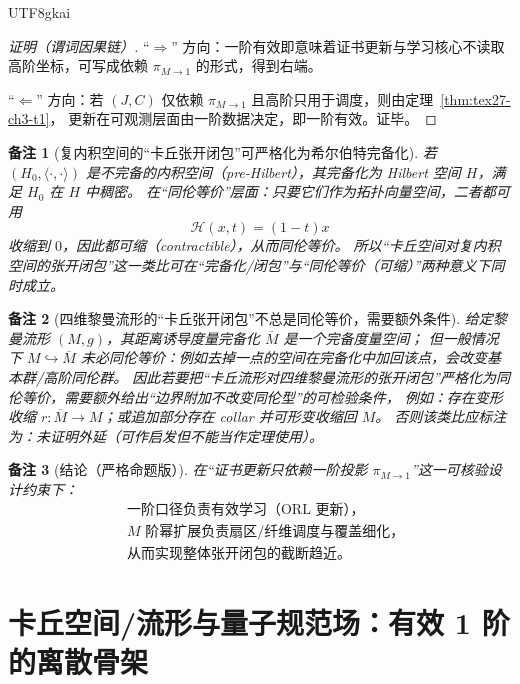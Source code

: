 \documentclass[12pt]{article}
\newtheorem{remark}{备注}[section]
\begin{document}
\begin{CJK*}{UTF8}{gkai}
\begin{proof}[证明（谓词因果链）]
“$\Rightarrow$” 方向：一阶有效即意味着证书更新与学习核心不读取高阶坐标，可写成依赖 $\pi_{M\to 1}$ 的形式，得到右端。

“$\Leftarrow$” 方向：若 $(J,C)$ 仅依赖 $\pi_{M\to 1}$ 且高阶只用于调度，则由定理~\ref{thm:tex27-ch3-t1}，
更新在可观测层面由一阶数据决定，即一阶有效。证毕。
\end{proof}

\begin{remark}[复内积空间的“卡丘张开闭包”可严格化为希尔伯特完备化]
若 $(H_0,\langle\cdot,\cdot\rangle)$ 是不完备的内积空间（pre-Hilbert），其完备化为 Hilbert 空间 $H$，满足 $H_0$ 在 $H$ 中稠密。
在“同伦等价”层面：只要它们作为拓扑向量空间，二者都可用
\[
  \mathcal{H}(x,t)=(1-t)x
\]
收缩到 $0$，因此都可缩（contractible），从而同伦等价。
所以“卡丘空间对复内积空间的张开闭包”这一类比可在“完备化/闭包”与“同伦等价（可缩）”两种意义下同时成立。
\end{remark}

\begin{remark}[四维黎曼流形的“卡丘张开闭包”不总是同伦等价，需要额外条件]
给定黎曼流形 $(M,g)$，其距离诱导度量完备化 $\overline{M}$ 是一个完备度量空间；
但一般情况下 $M\hookrightarrow \overline{M}$ 未必同伦等价：例如去掉一点的空间在完备化中加回该点，会改变基本群/高阶同伦群。
因此若要把“卡丘流形对四维黎曼流形的张开闭包”严格化为同伦等价，需要额外给出“边界附加不改变同伦型”的可检验条件，
例如：存在变形收缩 $r:\overline{M}\to M$；或追加部分存在 collar 并可形变收缩回 $M$。
否则该类比应标注为：未证明外延（可作启发但不能当作定理使用）。
\end{remark}

\begin{remark}[结论（严格命题版）]
在“证书更新只依赖一阶投影 $\pi_{M\to 1}$”这一可核验设计约束下：
\[
  \boxed{\begin{aligned}
    &\text{一阶口径负责有效学习（ORL 更新），}\\
    &\text{$M$ 阶幂扩展负责扇区/纤维调度与覆盖细化，}\\
    &\text{从而实现整体张开闭包的截断趋近。}
  \end{aligned}}
\]
\end{remark}

\clearpage

\section{卡丘空间/流形与量子规范场：有效 1 阶的离散骨架}
\label{sec:tex27-ch4-cauchy-quantum-gauge}


\end{CJK*}
\end{document}
